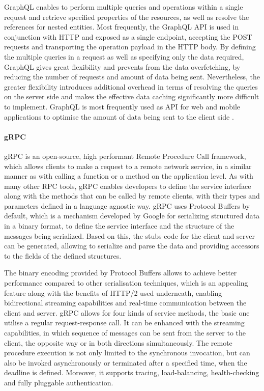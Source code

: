 GraphQL enables to perform multiple queries and operations within a single request and retrieve specified properties of the resources, as well as resolve the references for nested entities. Most frequently, the GraphQL API is used in conjunction with HTTP and exposed as a single endpoint, accepting the POST requests and transporting the operation payload in the HTTP body. By defining the multiple queries in a request as well as specifying only the data required, GraphQL gives great flexibility and prevents from the data overfetching, by reducing the number of requests and amount of data being sent. Nevertheless, the greater flexibility introduces additional overhead in terms of resolving the queries on the server side and makes the effective data caching significantly more difficult to implement. GraphQL is most frequently used as API for web and mobile applications to optimise the amount of data being sent to the client side \cite{APIDesignInDistributedSystems}.

\paragraph*{gRPC}

gRPC \cite{gRPC} is an open-source, high performant Remote Procedure Call framework, which allows clients to make a request to a remote network service, in a similar manner as with calling a function or a method on the application level.
As with many other RPC tools, gRPC enables developers to define the service interface along with the methods that can be called by remote clients, with their types and parameters defined in a language agnostic way.
gRPC uses Protocol Buffers by default, which is a mechanism developed by Google for serializing structured data in a binary format, to define the service interface and the structure of the messages being serialized.
Based on this, the stubs code for the client and server can be generated, allowing to serialize and parse the data and providing accessors to the fields of the defined structures.

The binary encoding provided by Protocol Buffers allows to achieve better performance compared to other serialisation techniques, which is an appealing feature along with the benefits of HTTP/2 used underneath, enabling bidirectional streaming capabilities and real-time communication between the client and server.
gRPC allows for four kinds of service methods, the basic one utilise a regular request-response call. It can be enhanced with the streaming capabilities, in which sequence of messages can be sent from the server to the client, the opposite way or in both directions simultaneously.
The remote procedure execution is not only limited to the synchronous invocation, but can also be invoked asynchronously or terminated after a specified time, when the deadline is defined. Moreover, it supports tracing, load-balancing, health-checking and fully pluggable authentication.

